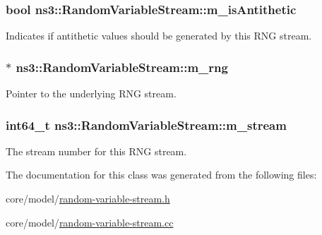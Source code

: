 \subsubsection[{\texorpdfstring{m\+\_\+is\+Antithetic}{m_isAntithetic}}]{\setlength{\rightskip}{0pt plus 5cm}bool ns3\+::\+Random\+Variable\+Stream\+::m\+\_\+is\+Antithetic\hspace{0.3cm}{\ttfamily [private]}}\hypertarget{classns3_1_1RandomVariableStream_a91017ccb003344625d469b3f5caf5c0e}{}\label{classns3_1_1RandomVariableStream_a91017ccb003344625d469b3f5caf5c0e}
Indicates if antithetic values should be generated by this R\+NG stream. 
\subsubsection[{\texorpdfstring{m\+\_\+rng}{m_rng}}]{$\ast$ ns3\+::\+Random\+Variable\+Stream\+::m\+\_\+rng\hspace{0.3cm}{\ttfamily [private]}}\hypertarget{classns3_1_1RandomVariableStream_ad944ab349eeee833c43ddcc7c749d1fe}{}\label{classns3_1_1RandomVariableStream_ad944ab349eeee833c43ddcc7c749d1fe}
Pointer to the underlying R\+NG stream. 
\subsubsection[{\texorpdfstring{m\+\_\+stream}{m_stream}}]{\setlength{\rightskip}{0pt plus 5cm}int64\+\_\+t ns3\+::\+Random\+Variable\+Stream\+::m\+\_\+stream\hspace{0.3cm}{\ttfamily [private]}}\hypertarget{classns3_1_1RandomVariableStream_ab494eafbd56af49c75b504cf5b712ae7}{}\label{classns3_1_1RandomVariableStream_ab494eafbd56af49c75b504cf5b712ae7}
The stream number for this R\+NG stream. 

The documentation for this class was generated from the following files\+:\begin{DoxyCompactItemize}
\item 
core/model/\hyperlink{random-variable-stream_8h}{random-\/variable-\/stream.\+h}\item 
core/model/\hyperlink{random-variable-stream_8cc}{random-\/variable-\/stream.\+cc}\end{DoxyCompactItemize}
